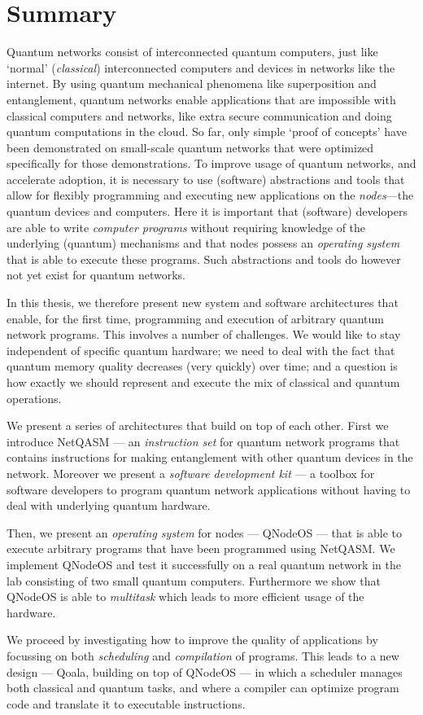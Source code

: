 \chapter*{Summary}

Quantum networks consist of interconnected quantum computers, just like `normal' (\emph{classical}) interconnected computers and devices in networks like the internet.
By using quantum mechanical phenomena like superposition and entanglement, quantum networks enable applications that are impossible with classical computers and networks, like extra secure communication and doing quantum computations in the cloud.
So far, only simple `proof of concepts' have been demonstrated on small-scale quantum networks that were optimized specifically for those demonstrations.
To improve usage of quantum networks, and accelerate adoption, it is necessary to use (software) abstractions and tools that allow for flexibly programming and executing new applications on the \emph{nodes}---the quantum devices and computers.
Here it is important that (software) developers are able to write \emph{computer programs} without requiring knowledge of the underlying (quantum) mechanisms and that nodes possess an \emph{operating system} that is able to execute these programs.
Such abstractions and tools do however not yet exist for quantum networks.

In this thesis, we therefore present new system and software architectures that enable, for the first time, programming and execution of arbitrary quantum network programs.
This involves a number of challenges.
We would like to stay independent of specific quantum hardware; we need to deal with the fact that quantum memory quality decreases (very quickly) over time; and a question is how exactly we should represent and execute the mix of classical and quantum operations.

We present a series of architectures that build on top of each other.
First we introduce NetQASM --- an \emph{instruction set} for quantum network programs that contains instructions for making entanglement with other quantum devices in the network.
Moreover we present a \emph{software development kit} --- a toolbox for software developers to program quantum network applications without having to deal with underlying quantum hardware.

Then, we present an \emph{operating system} for nodes --- QNodeOS --- that is able to execute arbitrary programs that have been programmed using NetQASM.
We implement QNodeOS and test it successfully on a real quantum network in the lab consisting of two small quantum computers.
Furthermore we show that QNodeOS is able to \emph{multitask} which leads to more efficient usage of the hardware.

We proceed by investigating how to improve the quality of applications by focussing on both \emph{scheduling} and \emph{compilation} of programs.
This leads to a new design --- Qoala, building on top of QNodeOS --- in which a scheduler manages both classical and quantum tasks, and where a compiler can optimize program code and translate it to executable instructions.

